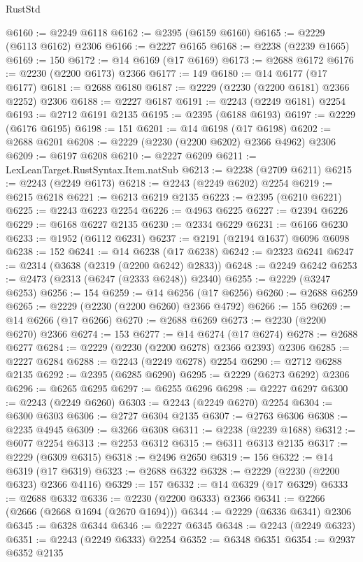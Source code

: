 \begin{lexlean}{RustStd}
\begin{coremodule}
@6160 := @2249 @6118
@6162 := @2395 (@6159 @6160)
@6165 := @2229 (@6113 @6162) @2306
@6166 := @2227 @6165
@6168 := @2238 (@2239 @1665)
@6169 := 150
@6172 := @14 @6169 (@17 @6169)
@6173 := @2688 @6172
@6176 := @2230 (@2200 @6173) @2366
@6177 := 149
@6180 := @14 @6177 (@17 @6177)
@6181 := @2688 @6180
@6187 := @2229 (@2230 (@2200 @6181) @2366 @2252) @2306
@6188 := @2227 @6187
@6191 := @2243 (@2249 @6181) @2254
@6193 := @2712 @6191 @2135
@6195 := @2395 (@6188 @6193)
@6197 := @2229 (@6176 @6195)
@6198 := 151
@6201 := @14 @6198 (@17 @6198)
@6202 := @2688 @6201
@6208 := @2229 (@2230 (@2200 @6202) @2366 @4962) @2306
@6209 := @6197 @6208
@6210 := @2227 @6209
@6211 := LexLeanTarget.RustSyntax.Item.natSub
@6213 := @2238 (@2709 @6211)
@6215 := @2243 (@2249 @6173)
@6218 := @2243 (@2249 @6202) @2254
@6219 := @6215 @6218
@6221 := @6213 @6219 @2135
@6223 := @2395 (@6210 @6221)
@6225 := @2243 @6223 @2254
@6226 := @4963 @6225
@6227 := @2394 @6226
@6229 := @6168 @6227 @2135
@6230 := @2334 @6229
@6231 := @6166 @6230
@6233 := @1952 (@6112 @6231)
@6237 := @2191 (@2194 @1637) @6096 @6098
@6238 := 152
@6241 := @14 @6238 (@17 @6238)
@6242 := @2323 @6241
@6247 := @2314 (@3638 (@2319 (@2200 @6242) @2833))
@6248 := @2249 @6242
@6253 := @2473 (@2313 (@6247 (@2333 @6248)) @2340)
@6255 := @2229 (@3247 @6253)
@6256 := 154
@6259 := @14 @6256 (@17 @6256)
@6260 := @2688 @6259
@6265 := @2229 (@2230 (@2200 @6260) @2366 @4792)
@6266 := 155
@6269 := @14 @6266 (@17 @6266)
@6270 := @2688 @6269
@6273 := @2230 (@2200 @6270) @2366
@6274 := 153
@6277 := @14 @6274 (@17 @6274)
@6278 := @2688 @6277
@6284 := @2229 (@2230 (@2200 @6278) @2366 @2393) @2306
@6285 := @2227 @6284
@6288 := @2243 (@2249 @6278) @2254
@6290 := @2712 @6288 @2135
@6292 := @2395 (@6285 @6290)
@6295 := @2229 (@6273 @6292) @2306
@6296 := @6265 @6295
@6297 := @6255 @6296
@6298 := @2227 @6297
@6300 := @2243 (@2249 @6260)
@6303 := @2243 (@2249 @6270) @2254
@6304 := @6300 @6303
@6306 := @2727 @6304 @2135
@6307 := @2763 @6306
@6308 := @2235 @4945
@6309 := @3266 @6308
@6311 := @2238 (@2239 @1688)
@6312 := @6077 @2254
@6313 := @2253 @6312
@6315 := @6311 @6313 @2135
@6317 := @2229 (@6309 @6315)
@6318 := @2496 @2650
@6319 := 156
@6322 := @14 @6319 (@17 @6319)
@6323 := @2688 @6322
@6328 := @2229 (@2230 (@2200 @6323) @2366 @4116)
@6329 := 157
@6332 := @14 @6329 (@17 @6329)
@6333 := @2688 @6332
@6336 := @2230 (@2200 @6333) @2366
@6341 := @2266 (@2666 (@2668 @1694 (@2670 @1694)))
@6344 := @2229 (@6336 @6341) @2306
@6345 := @6328 @6344
@6346 := @2227 @6345
@6348 := @2243 (@2249 @6323)
@6351 := @2243 (@2249 @6333) @2254
@6352 := @6348 @6351
@6354 := @2937 @6352 @2135

\end{coremodule}
\end{lexlean}
